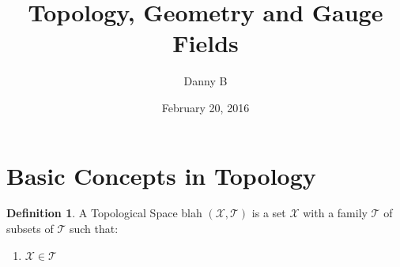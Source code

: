 \documentclass{amsart}
\theoremstyle{plain}
\theoremstyle{definition}
\newtheorem{definition}{Definition}[section]
\theoremstyle{remark}
\begin{document}
\title{Topology, Geometry and Gauge Fields}
\author{Danny B}
\date{February 20, 2016}


\section{Basic Concepts in Topology}


\begin{definition}
A Topological Space blah $(\mathcal{X}, \mathcal{T})$ is a set $\mathcal{X}$ with a family $\mathcal{T}$ of subsets of $\mathcal{T}$ such that:
\begin{enumerate}
 \item $\mathcal{X} \in \mathcal{T}$
\end{enumerate}
\end{definition}
\end{document}
